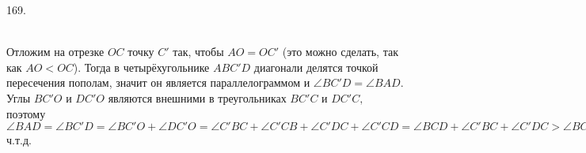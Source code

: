 169. \begin{figure}[ht!]
\end{figure}\\
Отложим на отрезке $OC$ точку $C'$ так, чтобы $AO=OC'$ (это можно сделать, так как $AO<OC$). Тогда в четырёхугольнике $ABC'D$ диагонали делятся точкой пересечения пополам, значит он является параллелограммом и $\angle BC'D=\angle BAD.$ Углы $BC'O$ и $DC'O$ являются внешними в треугольниках $BC'C$ и $DC'C,$ поэтому $\angle BAD=\angle BC'D=\angle BC'O+\angle DC'O=\angle C'BC+\angle C'CB+\angle C'DC+\angle C'CD=\angle BCD+\angle C'BC+\angle C'DC>\angle BCD,$ ч.т.д.\\
